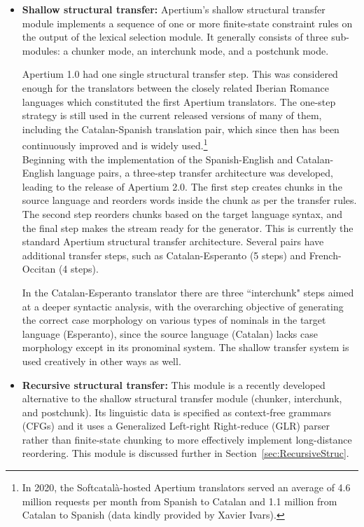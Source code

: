 \documentclass[free]{flammie}
\begin{document}
\begin{itemize}
    \item \textbf{Shallow structural transfer:} Apertium's shallow structural
        transfer module implements a sequence of one or more finite-state
        constraint rules on the output of the lexical selection module. It
        generally consists of three sub-modules: a chunker mode, an interchunk
        mode, and a postchunk mode.

        Apertium 1.0 had one single structural transfer step.  This was
        considered enough for the translators between the closely related
        Iberian Romance languages which constituted the first Apertium
        translators. The one-step strategy is still used in the current released
        versions of many of them, including the Catalan-Spanish translation
        pair, which since then has been continuously improved and is widely
        used.\footnote{In 2020, the Softcatalà-hosted Apertium translators
        served an average of 4.6 million requests per month from Spanish to
        Catalan and 1.1 million from Catalan to Spanish (data kindly provided by
        Xavier Ivars).}\\ Beginning with the implementation of the
        Spanish-English and Catalan-English language pairs, a three-step
        transfer architecture was developed, leading to the release of Apertium
        2.0. The first step creates chunks in the source language and reorders
        words inside the chunk as per the transfer rules. The second step
        reorders chunks based on the target language syntax, and the final step
        makes the stream ready for the generator. This is currently the standard
        Apertium structural transfer architecture. Several pairs have additional
        transfer steps, such as Catalan-Esperanto (5 steps) and French-Occitan
        (4 steps).

        In the Catalan-Esperanto translator there are three ``interchunk" steps
        aimed at a deeper syntactic analysis, with the overarching objective of
        generating the correct case morphology on various types of nominals in
        the target language (Esperanto), since the source language (Catalan)
        lacks case morphology except in its pronominal system.  The shallow
        transfer system is used creatively in other ways as well.
\end{itemize}

\begin{itemize}
    \item \textbf{Recursive structural transfer:}
        This module is a recently developed alternative to the shallow
        structural transfer module (chunker, interchunk, and postchunk). Its
        linguistic data is specified as context-free grammars (CFGs) and it uses
        a Generalized Left-right Right-reduce (GLR) parser rather than
        finite-state chunking to more effectively implement long-distance
        reordering.  This module is discussed further in
        Section~\ref{sec:RecursiveStruc}.
\end{itemize}
\end{document}
